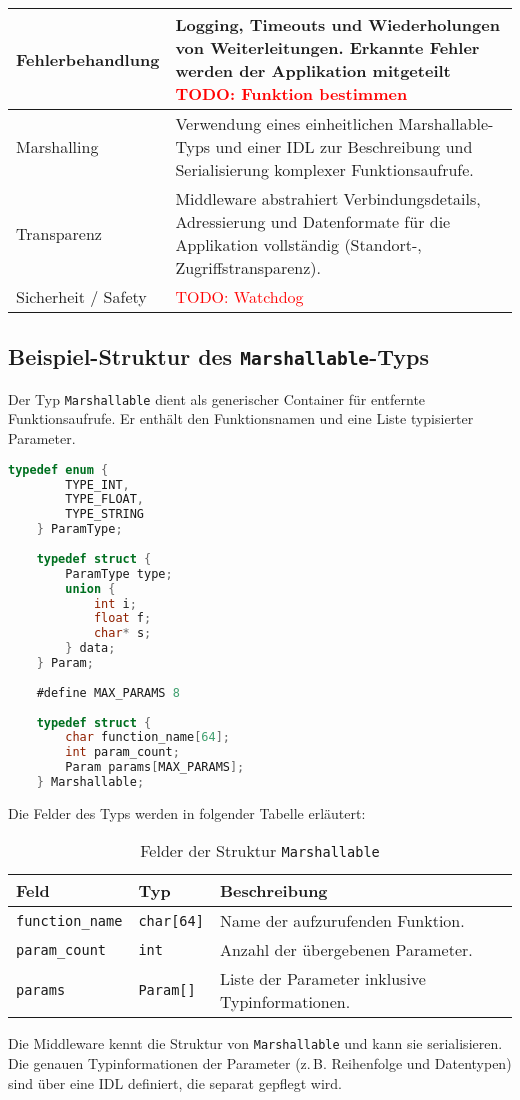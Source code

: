 \begin{longtable}{|>{\raggedright\arraybackslash}p{4cm}|>{\raggedright\arraybackslash}p{10cm}|}
	\\
	\hline
	Fehlerbehandlung
	& Logging, Timeouts und Wiederholungen von Weiterleitungen. Erkannte Fehler werden der Applikation mitgeteilt \textcolor{red}{TODO: Funktion bestimmen}
	\\
	\hline
	Marshalling
	& Verwendung eines einheitlichen Marshallable-Typs und einer IDL zur Beschreibung und Serialisierung komplexer Funktionsaufrufe.
	\\
	\hline
	Transparenz
	& Middleware abstrahiert Verbindungsdetails, Adressierung und Datenformate für die Applikation vollständig (Standort-, Zugriffstransparenz).
	\\
	\hline
	Sicherheit / Safety
	& \textcolor{red}{TODO: Watchdog }
	\\
	\hline
	
\end{longtable}

\subsection*{Beispiel-Struktur des \texttt{Marshallable}-Typs}

Der Typ \texttt{Marshallable} dient als generischer Container für entfernte Funktionsaufrufe. Er enthält den Funktionsnamen und eine Liste typisierter Parameter.

\begin{lstlisting}[language=C, caption={Definition des \texttt{Marshallable}-Typs}]
	typedef enum {
		TYPE_INT,
		TYPE_FLOAT,
		TYPE_STRING
	} ParamType;
	
	typedef struct {
		ParamType type;
		union {
			int i;
			float f;
			char* s;
		} data;
	} Param;
	
	#define MAX_PARAMS 8
	
	typedef struct {
		char function_name[64];
		int param_count;
		Param params[MAX_PARAMS];
	} Marshallable;
\end{lstlisting}

\noindent Die Felder des Typs werden in folgender Tabelle erläutert:

\begin{table}[h]
	\centering
	\caption{Felder der Struktur \texttt{Marshallable}}
	\begin{tabularx}{\textwidth}{|l|l|X|}
		\hline
		\textbf{Feld} & \textbf{Typ} & \textbf{Beschreibung} \\
		\hline
		\texttt{function\_name} & \texttt{char[64]} & Name der aufzurufenden Funktion. \\
		\hline
		\texttt{param\_count} & \texttt{int} & Anzahl der übergebenen Parameter. \\
		\hline
		\texttt{params} & \texttt{Param[]} & Liste der Parameter inklusive Typinformationen. \\
		\hline
	\end{tabularx}
\end{table}

\noindent
Die Middleware kennt die Struktur von \texttt{Marshallable} und kann sie serialisieren. Die genauen Typinformationen der Parameter (z.\,B. Reihenfolge und Datentypen) sind über eine IDL definiert, die separat gepflegt wird.

